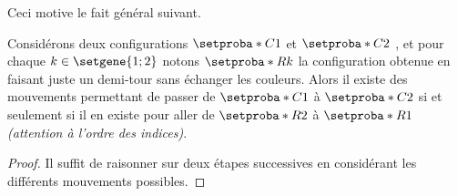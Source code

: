 Ceci motive le fait général suivant.


\begin{fact} \label{symmetry-no-color}
	Considérons deux configurations $\setproba*{C}{1}$ et $\setproba*{C}{2}$ , et pour chaque $k \in \setgene{1 ; 2}$ notons $\setproba*{R}{k}$ la configuration obtenue en faisant juste un demi-tour sans échanger les couleurs.
	Alors il existe des mouvements permettant de passer de $\setproba*{C}{1}$ à $\setproba*{C}{2}$ si et seulement si il en existe pour aller de $\setproba*{R}{2}$ à $\setproba*{R}{1}$ \emph{(attention à l'ordre des indices)}.
\end{fact}


\begin{proof}
	Il suffit de raisonner sur deux étapes successives en considérant les différents mouvements possibles.
\end{proof}
